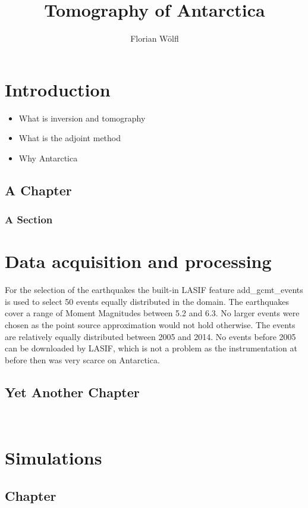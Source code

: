 \documentclass[
  twoside,
  11pt, a4paper,
  footinclude=true,
  headinclude=true,
  cleardoublepage=empty
]{scrbook}
\title{Tomography of Antarctica}
\author{Florian W\"olfl}
\begin{document}
\maketitle







\part{Introduction}

\begin{itemize}
\item What is inversion and tomography 
\item What is the adjoint method
\item Why Antarctica
\end{itemize}


\chapter{A Chapter}
\lipsum[1] %

\section{A Section}


\part{Data acquisition and processing}

For the selection of the earthquakes the built-in LASIF feature 
add\_gcmt\_events is used to select 50 events equally distributed in the
domain. The earthquakes cover a range of Moment Magnitudes between 5.2 and 6.3. 
No larger events were chosen as the point source approximation would not hold otherwise. 
The events are relatively equally distributed between 2005 and 2014. No events before 2005 can 
be downloaded by LASIF, which is not a problem as the instrumentation at before then was very scarce on Antarctica. 


\chapter{Yet Another Chapter}

  
\
\part{Simulations}
\chapter{ Chapter}
\lipsum[1]
    
\end{document}
